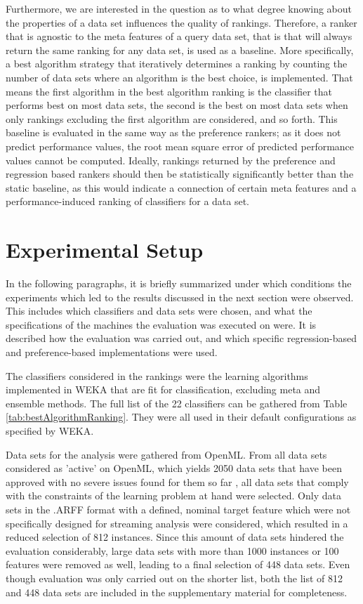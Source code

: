 Furthermore, we are interested in the question as to what degree knowing about the properties of a data set influences the quality of rankings. Therefore, a ranker that is agnostic to the meta features of a query data set, that is that will always return the same ranking for any data set, is used as a baseline. More specifically, a best algorithm strategy that iteratively determines a ranking by counting the number of data sets where an algorithm is the best choice, is implemented. That means the first algorithm in the best algorithm ranking is the classifier that performs best on most data sets, the second is the best on most data sets when only rankings excluding the first algorithm are considered, and so forth. This baseline is evaluated in the same way as the preference rankers; as it does not predict performance values, the root mean square error of predicted performance values cannot be computed. Ideally, rankings returned by the preference and regression based rankers should then be statistically significantly better than the static baseline, as this would indicate a connection of certain meta features and a performance-induced ranking of classifiers for a data set. 

\section{Experimental Setup}
In the following paragraphs, it is briefly summarized under which conditions the experiments which led to the results discussed in the next section were observed. This includes which classifiers and data sets were chosen, and what the specifications of the machines the evaluation was executed on were. It is described how the evaluation was carried out, and which specific regression-based and preference-based implementations were used.

The classifiers considered in the rankings were the learning algorithms implemented in WEKA that are fit for classification, excluding meta and ensemble methods. The full list of the 22 classifiers can be gathered from Table \ref{tab:bestAlgorithmRanking}. They were all used in their default configurations as specified by WEKA. 

Data sets for the analysis were gathered from OpenML. From all data sets considered as 'active' on OpenML, which yields 2050 data sets that have been approved with no severe issues found for them so far \cite{openMLGuide}, all data sets that comply with the constraints of the learning problem at hand were selected. Only data sets in the .ARFF format with a defined, nominal target feature which were not specifically designed for streaming analysis\footnotemark{} were considered, which resulted in a reduced selection of 812 instances. Since this amount of data sets hindered the evaluation considerably, large data sets with more than 1000 instances or 100 features were removed as well, leading to a final selection of 448 data sets. Even though evaluation was only carried out on the shorter list, both the list of 812 and 448 data sets are included in the supplementary material for completeness.


